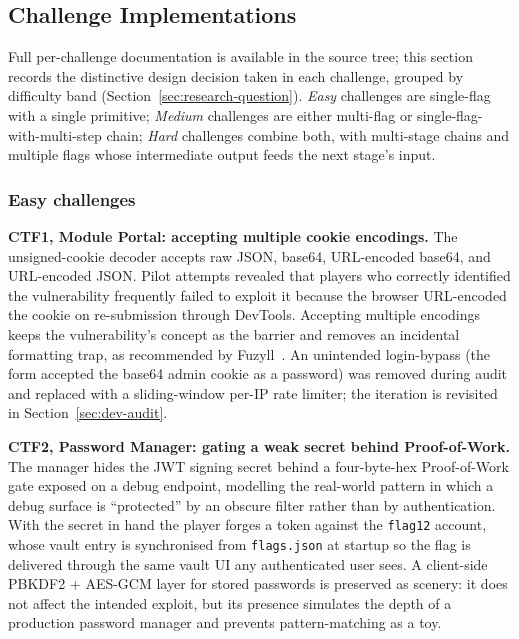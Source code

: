 \subsection{Challenge Implementations}
\label{sec:challenge-design}

Full per-challenge documentation is available in the source
tree; this section records the distinctive design decision
taken in each challenge, grouped by difficulty band
(Section~\ref{sec:research-question}). \emph{Easy} challenges
are single-flag with a single primitive; \emph{Medium}
challenges are either multi-flag or single-flag-with-multi-step
chain; \emph{Hard} challenges combine both, with multi-stage
chains and multiple flags whose intermediate output feeds the
next stage's input.

\subsubsection{Easy challenges}

\textbf{CTF1, Module Portal: accepting multiple cookie
encodings.} The unsigned-cookie decoder accepts raw JSON,
base64, URL-encoded base64, and URL-encoded JSON. Pilot
attempts revealed that players who correctly identified the
vulnerability frequently failed to exploit it because the
browser URL-encoded the cookie on re-submission through
DevTools. Accepting multiple encodings keeps the
vulnerability's concept as the barrier and removes an
incidental formatting trap, as recommended by
Fuzyll~\cite{Fuzyll2015}. An unintended login-bypass (the
form accepted the base64 admin cookie as a password) was
removed during audit and replaced with a sliding-window
per-IP rate limiter; the iteration is revisited in
Section~\ref{sec:dev-audit}.

\textbf{CTF2, Password Manager: gating a weak secret
behind Proof-of-Work.} The manager hides the JWT signing
secret behind a four-byte-hex Proof-of-Work gate exposed on
a debug endpoint, modelling the real-world pattern in which
a debug surface is ``protected'' by an obscure filter rather
than by authentication. With the secret in hand the player
forges a token against the \texttt{flag12} account, whose
vault entry is synchronised from \texttt{flags.json} at
startup so the flag is delivered through the same vault UI
any authenticated user sees. A client-side PBKDF2 + AES-GCM
layer for stored passwords is preserved as scenery: it does
not affect the intended exploit, but its presence simulates
the depth of a production password manager and prevents
pattern-matching as a toy.

